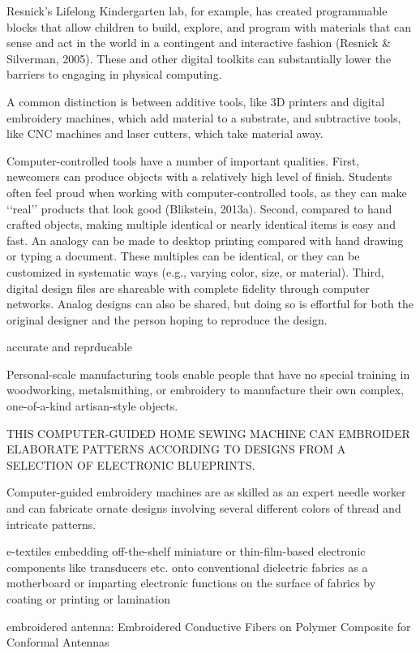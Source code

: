Resnick’s Lifelong Kindergarten lab,
for example, has created programmable blocks that allow
children to build, explore, and program with materials that
can sense and act in the world in a contingent and
interactive fashion (Resnick & Silverman, 2005). These and other digital toolkits can substantially lower the barriers to engaging in physical computing.


A common distinction is between additive tools, like
3D printers and digital embroidery machines, which add
material to a substrate, and subtractive tools, like CNC
machines and laser cutters, which take material away.

Computer-controlled tools have a number of important
qualities. First, newcomers can produce objects with a
relatively high level of finish. Students often feel proud
when working with computer-controlled tools, as they can
make ‘‘real’’ products that look good (Blikstein, 2013a).
Second, compared to hand crafted objects, making multiple
identical or nearly identical items is easy and fast. An
analogy can be made to desktop printing compared with
hand drawing or typing a document. These multiples can be
identical, or they can be customized in systematic ways
(e.g., varying color, size, or material). Third, digital design
files are shareable with complete fidelity through computer
networks. Analog designs can also be shared, but doing so
is effortful for both the original designer and the person
hoping to reproduce the design.

accurate and reprducable 

Personal-scale
manufacturing tools
enable people that
have no special
training in
woodworking,
metalsmithing, or
embroidery to manufacture their own complex, one-of-a-kind artisan-style objects.


THIS COMPUTER-GUIDED
HOME SEWING MACHINE CAN
EMBROIDER ELABORATE
PATTERNS ACCORDING TO
DESIGNS FROM A SELECTION
OF ELECTRONIC BLUEPRINTS. 

Computer-guided
embroidery machines are as skilled as an expert needle worker and can fabricate
ornate designs involving several different colors of thread and intricate patterns.


e-textiles
embedding off-the-shelf miniature or thin-film-based electronic components like transducers etc. onto conventional dielectric fabrics as a motherboard or imparting electronic functions on the surface of fabrics by coating or printing or lamination

embroidered antenna: Embroidered Conductive Fibers on Polymer Composite for Conformal Antennas


